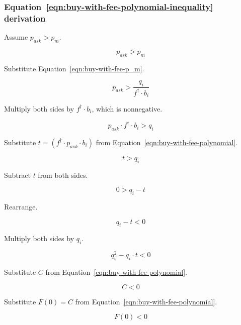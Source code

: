 \subsubsection{Equation~\ref{eqn:buy-with-fee-polynomial-inequality} derivation}%
\label{sssec:equation-eqn-buy-with-fee-polynomial-inequality-derivation}

Assume $p_{ask} > p_m$.

\begin{equation*}
	p_{ask} > p_m
\end{equation*}

Substitute Equation~\ref{eqn:buy-with-fee-p_m}.

\begin{equation*}
	p_{ask} > \frac{q_i}{f^{\dagger} \cdot b_i}
\end{equation*}

Multiply both sides by $f^{\dagger} \cdot b_i$, which is nonnegative.

\begin{equation*}
	p_{ask} \cdot f^{\dagger} \cdot b_i > q_i
\end{equation*}

Substitute $t = (f^{\dagger} \cdot p_{ask} \cdot b_i)$ from
Equation~\ref{eqn:buy-with-fee-polynomial}.

\begin{equation*}
	t > q_i
\end{equation*}

Subtract $t$ from both sides.

\begin{equation*}
	0 > q_i - t
\end{equation*}

Rearrange.

\begin{equation*}
	q_i - t < 0
\end{equation*}

Multiply both sides by $q_i$.

\begin{equation*}
	q_i^2 - q_i \cdot t < 0
\end{equation*}

Substitute $C$ from Equation~\ref{eqn:buy-with-fee-polynomial}.

\begin{equation*}
	C < 0
\end{equation*}

Substitute $F(0) = C$ from Equation~\ref{eqn:buy-with-fee-polynomial}.

\begin{equation*}
	F(0) < 0
\end{equation*}

